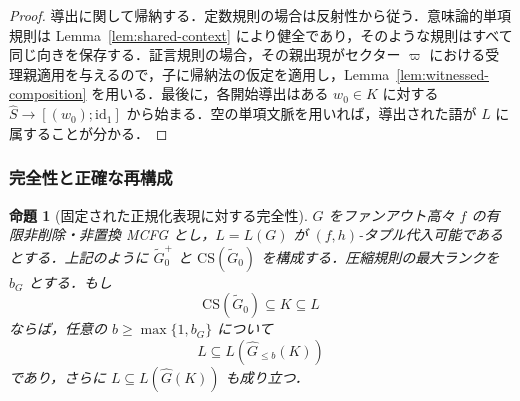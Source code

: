 \documentclass[11pt,a4paper]{ltjsarticle}
\numberwithin{equation}{section}
\theoremstyle{plain}
\newtheorem{proposition}[theorem]{命題}
\theoremstyle{definition}
\theoremstyle{remark}
\newcommand{\CS}{\mathrm{CS}}
\begin{document}
\begin{proof}
導出に関して帰納する．定数規則の場合は反射性から従う．意味論的単項規則は Lemma~\ref{lem:shared-context} により健全であり，そのような規則はすべて同じ向きを保存する．証言規則の場合，その親出現がセクター \(\varpi\) における受理親適用を与えるので，子に帰納法の仮定を適用し，Lemma~\ref{lem:witnessed-composition} を用いる．最後に，各開始導出はある \(w_0\in K\) に対する \(\widehat S\to[(w_0);\mathrm{id}_1]\) から始まる．空の単項文脈を用いれば，導出された語が \(L\) に属することが分かる．
\end{proof}

\subsubsection{完全性と正確な再構成}
\label{sec:completeness}

\begin{proposition}[固定された正規化表現に対する完全性]
\label{prop:completeness}
\(G\) をファンアウト高々 \(f\) の有限非削除・非置換 MCFG とし，\(L=L(G)\) が \((f,h)\)-タプル代入可能であるとする．上記のように \(\widetilde G_0^+\) と \(\CS(\widetilde G_0)\) を構成する．圧縮規則の最大ランクを \(b_G\) とする．もし
\[
  \CS(\widetilde G_0)\subseteq K\subseteq L
\]
ならば，任意の \(b\ge\max\{1,b_G\}\) について
\[
  L\subseteq L(\widehat G_{\le b}(K))
\]
であり，さらに \(L\subseteq L(\widehat G(K))\) も成り立つ．
\end{proposition}
\end{document}
